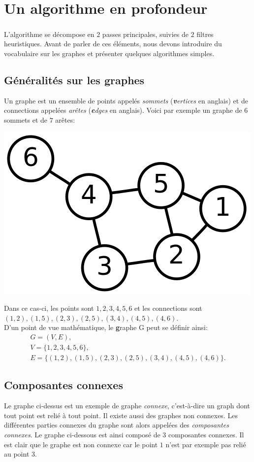 \section{Un algorithme en profondeur}

\subparagraph{}
L'algorithme se décompose en $2$ passes principales, suivies de $2$ filtres heuristiques. Avant de parler de ces éléments, nous devons introduire du vocabulaire sur les graphes et présenter quelques algorithmes simples.

\subsection{Généralités sur les graphes}

Un graphe est un ensemble de points appelés \textit{sommets} (\textit{\textbf{v}ertices} en anglais) et de connections appelées \textit{arêtes} (\textit{\textbf{e}dges} en anglais). Voici par exemple un graphe de $6$ sommets et de $7$ arêtes:

\begin{center}
\includegraphics[width=0.5\linewidth]{images/graph.png}
\end{center}

Dans ce cas-ci, les points sont $1, 2, 3, 4, 5, 6$ et les connections sont \\ $(1,2),(1,5),(2,3),(2,5),(3,4),(4,5),(4,6)$. \\
D'un point de vue mathématique, le \textbf{g}raphe G peut se définir ainsi: 
$$\begin{array}{l}
G = (V, E), \\
V = \{1,2,3,4,5,6\}, \\
E = \{(1,2),(1,5),(2,3),(2,5),(3,4),(4,5),(4,6)\}.
\end{array}$$


\subsection{Composantes connexes}
Le graphe ci-dessus est un exemple de graphe \textit{connexe}, c'est-à-dire un graph dont tout point est relié à tout point. Il existe aussi des graphes non connexes. Les différentes parties connexes du graphe sont alors appelées des \textit{composantes connexes}. Le graphe ci-dessous est ainsi composé de $3$ composantes connexes. Il est clair que le graphe est non connexe car le point $1$ n'est par exemple pas relié au point $3$.

